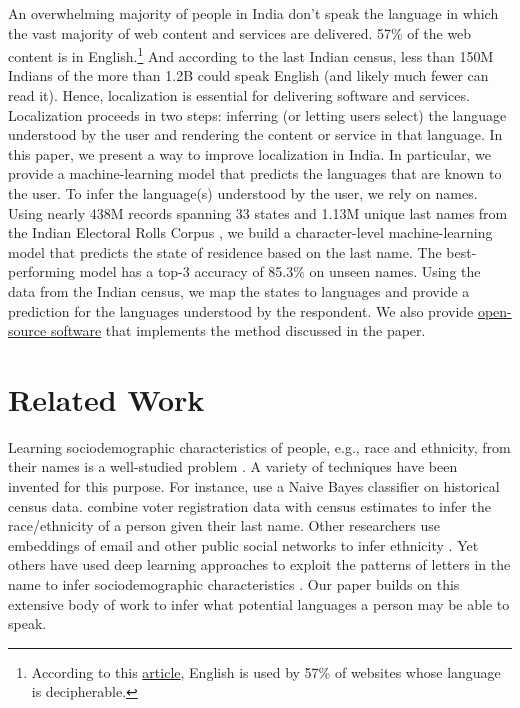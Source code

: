 \documentclass[11pt,  letterpaper]{article}
\begin{document}
An overwhelming majority of people in India don’t speak the language in which the vast majority of web content and services are delivered. 57\% of the web content is in English.\footnote{According to this \href{https://w3techs.com/technologies/overview/content_language}{article}, English is used by 57\% of websites whose language is decipherable.} And according to the last Indian census, less than 150M Indians of the more than 1.2B could speak English (and likely much fewer can read it). Hence, localization is essential for delivering software and services. Localization proceeds in two steps: inferring (or letting users select) the language understood by the user and rendering the content or service in that language. In this paper, we present a way to improve localization in India. In particular, we provide a machine-learning model that predicts the languages that are known to the user. To infer the language(s) understood by the user, we rely on names. Using nearly 438M records spanning 33 states and 1.13M unique last names from the Indian Electoral Rolls Corpus \citep{DVN/OG47IV_2023}, we build a character-level machine-learning model that predicts the state of residence based on the last name. The best-performing model has a top-3 accuracy of 85.3\%  on unseen names. Using the data from the Indian census, we map the states to languages and provide a prediction for the languages understood by the respondent. We also provide \href{https://github.com/in-rolls/instate}{open-source software} that implements the method discussed in the paper.

\section{Related Work}
Learning sociodemographic characteristics of people, e.g., race and ethnicity, from their names is a well-studied problem \citep{imai2016improving, parasurama2021racebert, wong2020machine, ye2017nationality, sood2018predicting}. A variety of techniques have been invented for this purpose. For instance, \citet{blevins2015jane} use a Naive Bayes classifier on historical census data. \citet{imai2016improving} combine voter registration data with census estimates to infer the race/ethnicity of a person given their last name. Other researchers use embeddings of email and other public social networks to infer ethnicity \citep{ye2017nationality, hur2022malaysian, junting_skiena}. Yet others have used deep learning approaches to exploit the patterns of letters in the name to infer sociodemographic characteristics \citep{hu2021s, sood2018predicting, parasurama2021racebert}. Our paper builds on this extensive body of work to infer what potential languages a person may be able to speak.
\end{document}
